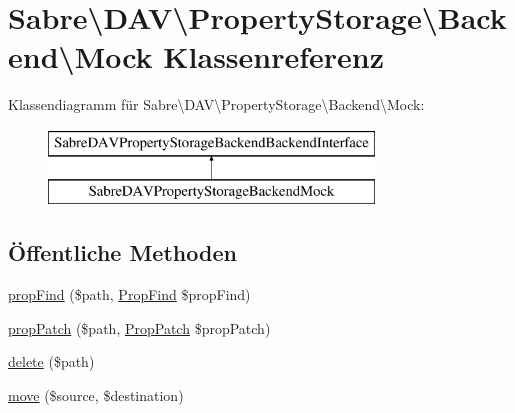 \hypertarget{class_sabre_1_1_d_a_v_1_1_property_storage_1_1_backend_1_1_mock}{}\section{Sabre\textbackslash{}D\+AV\textbackslash{}Property\+Storage\textbackslash{}Backend\textbackslash{}Mock Klassenreferenz}
\label{class_sabre_1_1_d_a_v_1_1_property_storage_1_1_backend_1_1_mock}
Klassendiagramm für Sabre\textbackslash{}D\+AV\textbackslash{}Property\+Storage\textbackslash{}Backend\textbackslash{}Mock\+:\begin{figure}[H]
\begin{center}
\leavevmode
\includegraphics[height=2.000000cm]{class_sabre_1_1_d_a_v_1_1_property_storage_1_1_backend_1_1_mock}
\end{center}
\end{figure}
\subsection*{Öffentliche Methoden}
\begin{DoxyCompactItemize}
\item 
\mbox{\hyperlink{class_sabre_1_1_d_a_v_1_1_property_storage_1_1_backend_1_1_mock_ae13c6fc2f23d340c09a9f62aa93a0ef9}{prop\+Find}} (\$path, \mbox{\hyperlink{class_sabre_1_1_d_a_v_1_1_prop_find}{Prop\+Find}} \$prop\+Find)
\item 
\mbox{\hyperlink{class_sabre_1_1_d_a_v_1_1_property_storage_1_1_backend_1_1_mock_aaee3eb54769430ea1b1a80ea58b774fe}{prop\+Patch}} (\$path, \mbox{\hyperlink{class_sabre_1_1_d_a_v_1_1_prop_patch}{Prop\+Patch}} \$prop\+Patch)
\item 
\mbox{\hyperlink{class_sabre_1_1_d_a_v_1_1_property_storage_1_1_backend_1_1_mock_a6c1045261abf7f52248c8f0b217f90ae}{delete}} (\$path)
\item 
\mbox{\hyperlink{class_sabre_1_1_d_a_v_1_1_property_storage_1_1_backend_1_1_mock_a91070b060260a58c766f281f67228b5f}{move}} (\$source, \$destination)
\end{DoxyCompactItemize}
